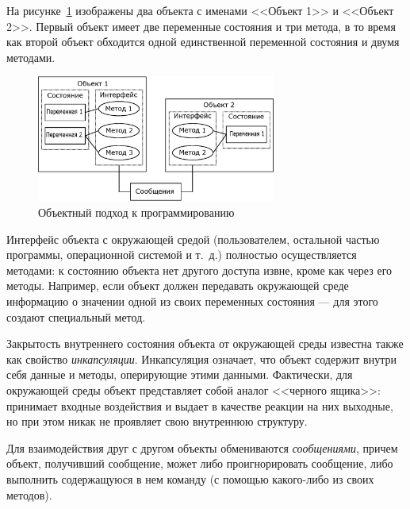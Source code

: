 На рисунке~\ref{ch10:refDrawing1} изображены два объекта с именами <<Объект 1>> и <<Объект 2>>. Первый объект имеет две
переменные состояния и три метода, в то время как второй объект обходится одной единственной переменной состояния и
двумя методами.

\begin{figure}[htb]
\begin{center}
\includegraphics[width=0.7\textwidth]{img/ris_10_2}
\caption{Объектный подход к программированию}
\label{ch10:refDrawing1}
\end{center}
\end{figure}


Интерфейс объекта с окружающей средой (пользователем, остальной частью программы, операционной системой и т.~д.)
полностью осуществляется методами: к состоянию объекта нет другого доступа извне, кроме как через его методы. Например,
если объект должен передавать окружающей среде информацию о значении одной из своих переменных состояния --- для этого
создают специальный метод.

Закрытость внутреннего состояния объекта от окружающей среды известна также как свойство
\emph{инкапсуляции}. Инкапсуляция означает, что объект содержит внутри себя данные и
методы, оперирующие этими данными. Фактически, для окружающей среды объект представляет собой аналог <<черного ящика>>:
принимает входные воздействия и выдает в качестве реакции на них выходные, но при этом никак не проявляет свою
внутреннюю структуру.

Для взаимодействия друг с другом объекты обмениваются \emph{сообщениями}, причем объект, получивший
сообщение, может либо проигнорировать сообщение, либо выполнить содержащуюся в нем команду (с помощью какого-либо из
своих методов).

